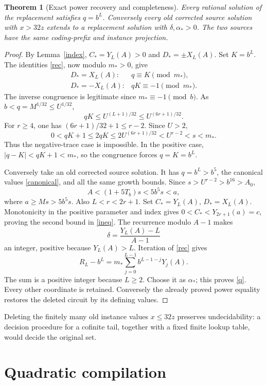 \documentclass[11pt]{article}
\newtheorem{theorem}{Theorem}
\begin{document}
\begin{theorem}[Exact power recovery and completeness]\label{main}
Every rational solution of the replacement satisfies \(q=b^L\).
Conversely every old corrected source solution with \(x>32z\)
extends to a replacement solution with \(\delta,\alpha_*>0\).
The two sources have the same coding-prefix and instance projection.
\end{theorem}
\begin{proof}
By Lemma~\ref{index}, \(C_*=Y_L(A)>0\) and
\(D_*=\pm X_L(A)\). Set \(K=b^L\).
The identities \eqref{rec}, now modulo \(m_*>0\), give
\[
 \begin{array}{ll}
 D_*=X_L(A):&q\equiv K\pmod{m_*},\\
 D_*=-X_L(A):&qK\equiv-1\pmod{m_*}.
 \end{array}
\]
The inverse congruence is legitimate since
\(m_*\equiv-1\pmod b\). As \(b<q=M^{1/32}\le U^{1/32}\),
\[
                  qK\le U^{(L+1)/32}\le U^{(6r+1)/32}.
\]
For \(r\ge4\), one has \((6r+1)/32+1\le r-2\). Since \(U>2\),
\[
 0<qK+1\le2qK\le2U^{(6r+1)/32}<U^{r-2}<s<m_*.
\]
Thus the negative-trace case is impossible. In the positive case,
\(|q-K|<qK+1<m_*\), so the congruence forces \(q=K=b^L\).

Conversely take an old corrected source solution.
It has \(q=b^L>b^5\), the canonical values \eqref{canonical},
and all the same growth bounds. Since
\(s>U^{r-2}>b^{16}>A_0\),
\[
                       A<(1+5T_b)s<5b^5s<a,
\]
where \(a\ge Ms>5b^5s\). Also \(L<r<2r+1\).
Set \(C_*=Y_L(A)\), \(D_*=X_L(A)\). Monotonicity in the
positive parameter and index gives
\(0<C_*<Y_{2r+1}(a)=c\), proving the second bound in
\eqref{ineq}. The recurrence modulo \(A-1\) makes
\[
                      \delta=\frac{Y_L(A)-L}{A-1}
\]
an integer, positive because \(Y_L(A)>L\).
Iteration of \eqref{rec} gives
\[
 R_L-b^L=m_*\sum_{j=0}^{L-1}b^{L-1-j}Y_j(A).
\]
The sum is a positive integer because \(L\ge2\).
Choose it as \(\alpha_*\); this proves \eqref{q}.
Every other coordinate is retained. Conversely the already proved
power equality restores the deleted circuit by its defining values.
\end{proof}

Deleting the finitely many old instance values \(x\le32z\) preserves
undecidability: a decision procedure for a cofinite tail, together
with a fixed finite lookup table, would decide the original set.

\section{Quadratic compilation}
\end{document}
